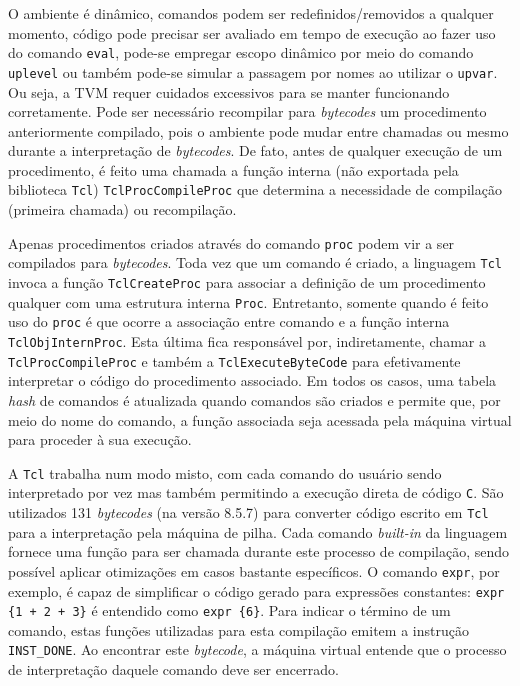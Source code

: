 O ambiente é dinâmico, comandos podem ser redefinidos/removidos a qualquer
momento, código pode precisar ser avaliado em tempo de execução ao
fazer uso do comando \verb!eval!, pode-se empregar escopo dinâmico por
meio do comando \verb!uplevel! ou também pode-se simular a passagem
por nomes ao utilizar o \verb!upvar!. Ou seja, a TVM requer cuidados
excessivos para se manter funcionando corretamente. Pode ser
necessário recompilar para \textit{bytecodes} um procedimento
anteriormente compilado, pois o ambiente pode mudar entre chamadas ou
mesmo durante a interpretação de \textit{bytecodes}. De fato, antes de
qualquer execução de um procedimento, é feito uma chamada a função
interna (não exportada pela biblioteca \texttt{Tcl})
\verb!TclProcCompileProc! que determina a necessidade de compilação
(primeira chamada) ou recompilação.

Apenas procedimentos criados através do comando \verb!proc! podem vir
a ser compilados para \textit{bytecodes}. Toda vez que um comando é
criado, a linguagem \texttt{Tcl}
invoca a função \verb!TclCreateProc! para associar a definição de um
procedimento qualquer com uma
estrutura interna \verb!Proc!. Entretanto, somente quando é feito uso do
\verb!proc! é que ocorre a associação entre comando e a função interna
\verb!TclObjInternProc!. Esta
última fica responsável por, indiretamente, chamar a
\verb!TclProcCompileProc! e também a \verb!TclExecuteByteCode! para
efetivamente interpretar o código do procedimento associado.
 Em todos os casos, uma tabela \textit{hash}
de comandos é atualizada quando comandos são criados e permite que,
por meio do nome do comando, a função associada seja acessada pela
máquina virtual para proceder à sua execução.


A \texttt{Tcl} trabalha num modo misto, com cada comando do usuário sendo
interpretado por vez mas também permitindo a execução direta de código
\texttt{C}. São utilizados 131 \textit{bytecodes} (na versão 8.5.7)
para converter
código escrito em \texttt{Tcl} para a interpretação pela máquina de
pilha. Cada comando \textit{built-in} da linguagem fornece uma função
para ser chamada durante este processo de compilação, sendo possível
aplicar otimizações em casos bastante específicos. O comando
 \verb!expr!, por
exemplo, é capaz de simplificar o código gerado para expressões
constantes:
 \verb!expr {1 + 2 + 3}! é entendido como \verb!expr {6}!.
 Para indicar o término de um comando, estas funções
utilizadas para esta compilação emitem a instrução
\verb!INST_DONE!. Ao encontrar este \textit{bytecode}, a máquina
virtual entende que o processo de interpretação daquele comando deve
ser encerrado.


